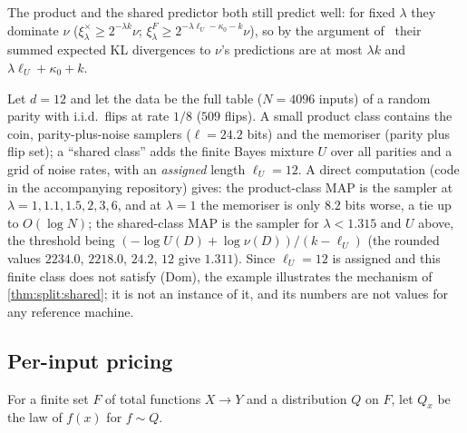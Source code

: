 The product and the shared predictor both still predict well: for fixed $\lambda$ they dominate $\nu$ ($\xi^\times_\lambda\ge2^{-\lambda k}\nu$; $\xi^F_\lambda\ge2^{-\lambda\ell_U-\kappa_0-k}\nu$), so by the argument of \citet[Theorem~5.3]{claudeSFI2026fundamentals}%
\ their summed expected KL divergences to $\nu$'s predictions are at most $\lambda k$ and $\lambda\ell_U+\kappa_0+k$.

\begin{example}\label{ex:split:noisyparity}
Let $d=12$ and let the data be the full table ($N=4096$ inputs) of a random parity with i.i.d.\ flips at rate $1/8$ ($509$ flips). A small product class contains the coin, parity-plus-noise samplers ($\ell=24.2$ bits) and the memoriser (parity plus flip set); a ``shared class'' adds the finite Bayes mixture $U$ over all parities and a grid of noise rates, with an \emph{assigned} length $\ell_U=12$. A direct computation (code in the accompanying repository) gives: the product-class MAP is the sampler at $\lambda=1,1.1,1.5,2,3,6$, and at $\lambda=1$ the memoriser is only $8.2$ bits worse, a tie up to $O(\log N)$; the shared-class MAP is the sampler for $\lambda<1.315$ and $U$ above, the threshold being $(-\log U(D)+\log\nu(D))/(k-\ell_U)$ (the rounded values $2234.0$, $2218.0$, $24.2$, $12$ give $1.311$). Since $\ell_U=12$ is assigned and this finite class does not satisfy (Dom), the example illustrates the mechanism of \cref{thm:split:shared}; it is not an instance of it, and its numbers are not values for any reference machine.
\end{example}

\subsection{Per-input pricing}\label{app:absorb:pricing}

For a finite set $F$ of total functions $X\to Y$ and a distribution $Q$ on $F$, let $Q_x$ be the law of $f(x)$ for $f\sim Q$.

